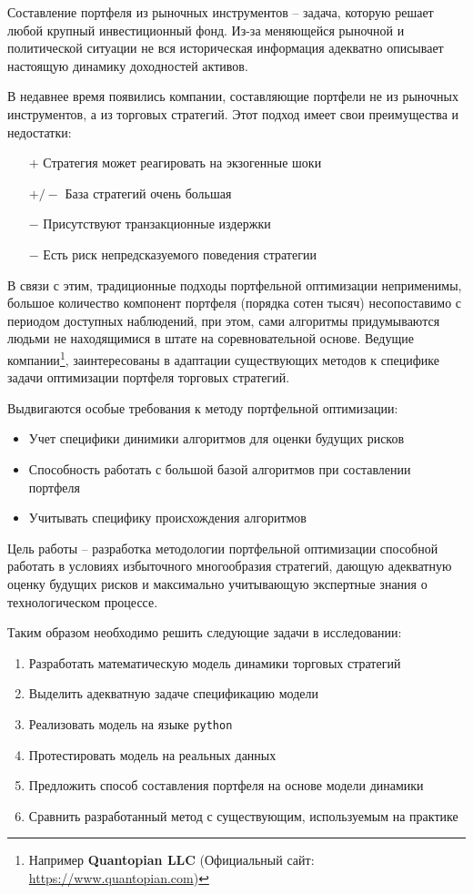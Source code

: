 Составление портфеля из рыночных инструментов -- задача, которую решает любой крупный инвестиционный фонд. Из-за меняющейся рыночной и политической ситуации не вся историческая информация адекватно описывает настоящую динамику доходностей активов. 

В недавнее время появились компании, составляющие портфели не из рыночных инструментов, а из торговых стратегий. Этот подход имеет свои преимущества и недостатки: 
\begin{itemize}
	\item[$+$] Стратегия может реагировать на экзогенные шоки
	\item[$+/-$] База стратегий очень большая
	\item[$-$] Присутствуют транзакционные издержки
	\item[$-$] Есть риск непредсказуемого поведения стратегии
\end{itemize}

В связи с этим, традиционные подходы портфельной оптимизации неприменимы, большое количество компонент портфеля (порядка сотен тысяч) несопоставимо с периодом доступных наблюдений, при этом, сами алгоритмы придумываются людьми не находящимися в штате на соревновательной основе. Ведущие компании\footnote{Например \textbf{Quantopian LLC} (Официальный сайт: \href{https://www.quantopian.com}{https://www.quantopian.com})},
заинтересованы в адаптации существующих методов к специфике задачи оптимизации портфеля торговых стратегий.

Выдвигаются особые требования к методу портфельной оптимизации:
\begin{itemize}
	\item Учет специфики динимики алгоритмов для оценки будущих рисков
	\item Способность работать с большой базой алгоритмов при составлении портфеля
	\item Учитывать специфику происхождения алгоритмов
\end{itemize}

Цель работы -- разработка методологии портфельной оптимизации способной работать в условиях избыточного многообразия стратегий, дающую адекватную оценку будущих рисков и максимально учитывающую экспертные знания о технологическом процессе. 

Таким образом необходимо решить следующие задачи в исследовании:
\begin{enumerate}
\item Разработать математическую модель динамики торговых стратегий
\item Выделить адекватную задаче спецификацию модели
\item Реализовать модель на языке \texttt{python}
\item Протестировать модель на реальных данных
\item Предложить способ составления портфеля на основе модели динамики
\item Сравнить разработанный метод с существующим, используемым на практике
\end{enumerate}

